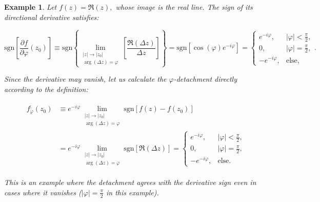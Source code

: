 \documentclass[11pt]{book}
\newtheorem{exm}[thm]{Example}
\begin{document}
\begin{exm}Let $f\left(z\right)=\Re\left(z\right),$ whose image is the real line. The sign of its directional derivative satisfies:

$$\text{sgn}\left[\frac{\partial f}{\partial\varphi}\left(z_{0}\right)\right]\equiv \text{sgn}\left\{ \underset{\begin{array}{c}
\left|z\right|\to\left|z_{0}\right|\\
\arg\left(\Delta z\right)=\varphi
\end{array}}{\lim}\left[\frac{\Re\left(\Delta z\right)}{\Delta z}\right]\right\} =\text{sgn}\left[\cos\left(\varphi\right)e^{-i\varphi}\right]=\begin{cases}
e^{-i\varphi}, & \left|\varphi\right|<\frac{\pi}{2},\\
0, & \left|\varphi\right|=\frac{\pi}{2},\\
-e^{-i\varphi}, & \text{else},
\end{cases}.$$

Since the derivative may vanish, let us calculate the $\varphi$-detachment directly according to the definition:

\begin{align}
&\begin{aligned}
f_{\varphi}^{;}\left(z_{0}\right) &\equiv e^{-i\varphi}\underset{\begin{array}{c}
\left|z\right|\to\left|z_{0}\right|\\
\arg\left(\Delta z\right)=\varphi
\end{array}}{\lim}\text{sgn}\left[f\left(z\right)-f\left(z_{0}\right)\right] \\
&=e^{-i\varphi}\underset{\begin{array}{c}
\left|z\right|\to\left|z_{0}\right|\\
\arg\left(\Delta z\right)=\varphi
\end{array}}{\lim}\text{sgn}\left[\Re\left(\Delta z\right)\right]=\begin{cases}
e^{-i\varphi}, & \left|\varphi\right|<\frac{\pi}{2},\\
0, & \left|\varphi\right|=\frac{\pi}{2},\\
-e^{-i\varphi}, & \text{else}.
\end{cases}
\end{aligned}
\end{align}

This is an example where the detachment agrees with the derivative sign even in cases where it vanishes ($\left|\varphi\right|=\frac{\pi}{2}$ in this example).
\end{exm}
\end{document}
